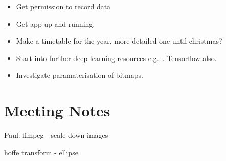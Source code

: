 \documentclass[]{weekly-report}
\begin{document}
\begin{itemize}
\item Get permission to record data

\item Get app up and running.

\item Make a timetable for the year, more detailed one until christmas?

\item Start into further deep learning resources e.g.~\cite{Ng-Coursera-2016, VincentVanhoucke-Udacity-2016, Nvidia-DL-Course-2016}. Tensorflow also.

\item Investigate paramaterisation of bitmaps.

\end{itemize}

\section{Meeting Notes}

Paul:
ffmpeg - scale down images

hoffe transform - ellipse


{}



\label{last_page}

 
\end{document}

